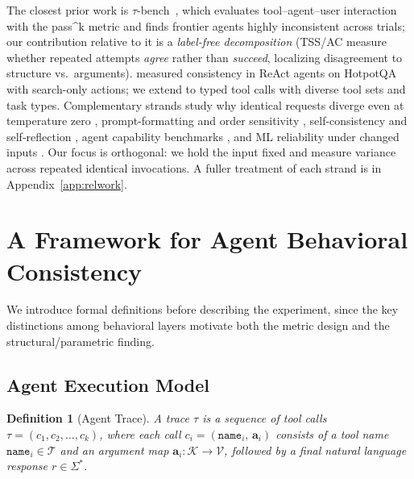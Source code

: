 \documentclass[11pt]{article}
\newtheorem{definition}{Definition}
\newcommand{\passk}{pass\textasciicircum k}
\begin{document}
The closest prior work is $\tau$-bench~\citep{yao2024taubench}, which evaluates
tool--agent--user interaction with the \passk{} metric and finds frontier
agents highly inconsistent across trials; our contribution relative to it is a
\emph{label-free decomposition} (TSS/AC measure whether repeated attempts
\emph{agree} rather than \emph{succeed}, localizing disagreement to structure
vs.\ arguments). \citet{mehta2026disagree} measured consistency in ReAct agents
on HotpotQA with search-only actions; we extend to typed tool calls with
diverse tool sets and task types. Complementary strands study why identical
requests diverge even at temperature zero
\citep{thinking2025nondeterminism,atil2024nondeterminism}, prompt-formatting and
order sensitivity \citep{sclar2024quantifying,lu2022fantastically,perez2022true},
self-consistency and self-reflection
\citep{wang2023selfconsistency,renze2024self}, agent capability benchmarks
\citep{liu2023agentbench,qin2023toolllm,li2023apibank,patil2023gorilla,schick2023toolformer,kapoor2024ai},
and ML reliability under changed inputs
\citep{lakshminarayanan2017simple}. Our focus is orthogonal: we hold the input
fixed and measure variance across repeated identical invocations. A fuller
treatment of each strand is in Appendix~\ref{app:relwork}.

\section{A Framework for Agent Behavioral Consistency}

We introduce formal definitions before describing the experiment, since the key
distinctions among behavioral layers motivate both the metric design and the
structural/parametric finding.

\subsection{Agent Execution Model}

\begin{definition}[Agent Trace]
A \emph{trace} $\tau$ is a sequence of tool calls
$\tau = (c_1, c_2, \ldots, c_k)$, where each call
$c_i = (\mathtt{name}_i,\, \mathbf{a}_i)$ consists of a tool name
$\mathtt{name}_i \in \mathcal{T}$ and an argument map
$\mathbf{a}_i : \mathcal{K} \to \mathcal{V}$, followed by a final natural
language response $r \in \Sigma^*$.
\end{definition}
\end{document}
